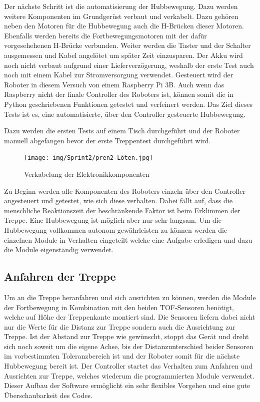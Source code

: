 Der nächste Schritt ist die automatisierung der Hubbewegung. Dazu werden weitere Komponenten im Grundgerüst verbaut und verkabelt. Dazu gehören neben den Motoren für die Hubbewegung auch die H-Brücken dieser Motoren. Ebenfalls werden bereits die Fortbewegungsmotoren mit der dafür vorgesehehenen H-Brücke verbunden. Weiter werden die Taster und der Schalter ausgemessen und Kabel angelötet um später Zeit einzusparen. Der Akku wird noch nicht verbaut aufgrund einer Lieferverzögerung, weshalb der erste Test auch noch mit einem Kabel zur Stromversorgung verwendet. Gesteuert wird der Roboter in diesem Versuch von einem Raspberry Pi 3B.
Auch wenn das Raspberry nicht der finale Controller des Roboters ist, können somit die in Python geschriebenen Funktionen getestet und verfeinert werden.
Das Ziel dieses Tests ist es, eine automatisierte, über den Controller gesteuerte Hubbewegung.

Dazu werden die ersten Tests auf einem Tisch durchgeführt und der Roboter manuell abgefangen bevor der erste Treppentest durchgeführt wird.

\begin{figure}[H]
  \texttt{[image: img/Sprint2/pren2-Löten.jpg]}
  \centering
  \caption{Verkabelung der Elektronikkomponenten}
  \label{fig:sprint-backlog-1}
\end{figure}

Zu Beginn werden alle Komponenten des Roboters einzeln über den Controller angesteuert und getestet, wie sich diese verhalten. Dabei fällt auf, dass die menschliche Reaktionszeit der beschränkende Faktor ist beim Erklimmen der Treppe. Eine Hubbewegung ist möglich aber nur sehr langsam. Um die Hubbewegung vollkommen autonom gewährleisten zu können werden die einzelnen Module in Verhalten eingeteilt welche eine Aufgabe erledigen und dazu die Module eigenständig verwendet.



\subsection{Anfahren der Treppe}

Um an die Treppe heranfahren und sich ausrichten zu können, werden die Module der Fortbewegung in Kombination mit den beiden TOF-Sensoren benötigt, welche auf Höhe der Treppenkante montiert sind. Die Sensoren liefern dabei nicht nur die Werte für die Distanz zur Treppe sondern auch die Ausrichtung zur Treppe. Ist der Abstand zur Treppe wie gewünscht, stoppt das Gerät und dreht sich noch soweit um die eigene Achse, bis der Distanzunterschied beider Sensoren im vorbestimmten Toleranzbereich ist und der Roboter somit für die nächste Hubbewegung bereit ist.
Der Controller startet das Verhalten zum Anfahren und Ausrichten zur Treppe, welches wiederum die programmierten Module verwendet. Dieser Aufbau der Software ermöglicht ein sehr flexibles Vorgehen und eine gute Überschaubarkeit des Codes.

